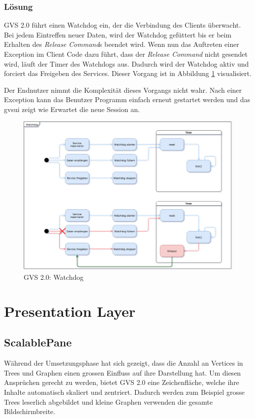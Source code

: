 \documentclass[11pt,a4paper,english,oneside]{book}
\numberwithin{equation}{chapter}
\begin{document}
	\subsubsection{Lösung}
	GVS 2.0 führt einen Watchdog ein, der die Verbindung des Clients überwacht. Bei jedem Eintreffen neuer Daten, wird der Watchdog gefüttert bis er beim Erhalten des \textit{Release Command}s beendet wird. Wenn nun das Auftreten einer Exception im Client Code dazu führt, dass der \textit{Release Command} nicht gesendet wird, läuft der Timer des Watchdogs aus. Dadurch wird der Watchdog aktiv und forciert das Freigeben des Services. Dieser Vorgang ist in Abbildung \ref{fig:watchdog} visualisiert.
	
	Der Endnutzer nimmt die Komplexität dieses Vorgangs nicht wahr. Nach einer Exception kann das Benutzer Programm einfach erneut gestartet werden und das \gls{gvsui} zeigt wie Erwartet die neue Session an.
	
	\begin{figure}[h!]
		\centering
		\includegraphics[width=0.7\linewidth]{assets/images/watchdog}
		\caption{GVS  2.0: Watchdog}
		\label{fig:watchdog}
	\end{figure}
	
	
	\section{Presentation Layer}
	
	\subsection{ScalablePane}
	Während der Umsetzungsphase hat sich gezeigt, dass die Anzahl an Vertices in Trees und Graphen einen grossen Einfluss auf ihre Darstellung hat. Um diesen Ansprüchen gerecht zu werden, bietet GVS 2.0 eine Zeichenfläche, welche ihre Inhalte automatisch skaliert und zentriert. Dadurch werden zum Beispiel grosse Trees leserlich abgebildet und kleine Graphen verwenden die gesamte Bildschirmbreite. 
	
\end{document}

